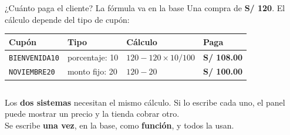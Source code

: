 \documentclass[aspectratio=169,10pt,c]{beamer}
\begin{document}
\begin{frame}{¿Cuánto paga el cliente? La fórmula va en la base}
\small Una compra de \textbf{S/ 120}. El cálculo depende del tipo de cupón:
\vspace{0.15cm}
\begin{center}
\small
\renewcommand{\arraystretch}{1.3}
\begin{tabular}{@{}llll@{}}
\toprule
\bfseries Cupón & \bfseries Tipo & \bfseries Cálculo & \bfseries Paga \\
\midrule
\texttt{BIENVENIDA10} & porcentaje: 10 & $120 - 120 \times 10 / 100$ & \textbf{S/ 108.00} \\
\texttt{NOVIEMBRE20} & monto fijo: 20 & $120 - 20$ & \textbf{S/ 100.00} \\
\bottomrule
\end{tabular}
\end{center}
\vspace{0.15cm}
\begin{columns}[c,onlytextwidth]
\centering
{}
\raggedright\small Los \textbf{dos sistemas} necesitan el mismo cálculo. Si lo escribe cada uno, el panel puede mostrar un precio y la tienda cobrar otro.\\[6pt]
Se escribe \textbf{una vez}, en la base, como \textbf{función}, y todos la usan.
\end{columns}
\vspace{0.2cm}
\end{frame}
\end{document}
